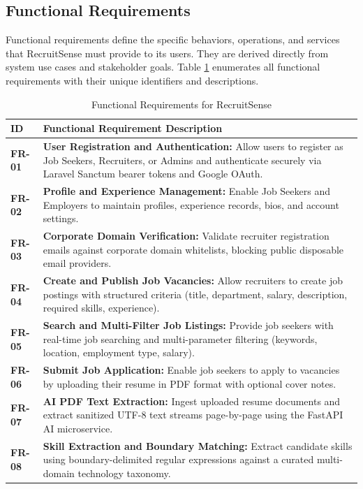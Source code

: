 \subsection{Functional Requirements}
Functional requirements define the specific behaviors, operations, and services that RecruitSense must provide to its users. They are derived directly from system use cases and stakeholder goals. Table \ref{tab:functional_reqs} enumerates all functional requirements with their unique identifiers and descriptions.

\begin{table}[h!]
\centering
\small
\caption{Functional Requirements for RecruitSense}
\label{tab:functional_reqs}
\begin{tabular}{|l|p{12cm}|}
\hline
\textbf{ID} & \textbf{Functional Requirement Description} \\ \hline
\textbf{FR-01} & \textbf{User Registration and Authentication:} Allow users to register as Job Seekers, Recruiters, or Admins and authenticate securely via Laravel Sanctum bearer tokens and Google OAuth. \\ \hline
\textbf{FR-02} & \textbf{Profile and Experience Management:} Enable Job Seekers and Employers to maintain profiles, experience records, bios, and account settings. \\ \hline
\textbf{FR-03} & \textbf{Corporate Domain Verification:} Validate recruiter registration emails against corporate domain whitelists, blocking public disposable email providers. \\ \hline
\textbf{FR-04} & \textbf{Create and Publish Job Vacancies:} Allow recruiters to create job postings with structured criteria (title, department, salary, description, required skills, experience). \\ \hline
\textbf{FR-05} & \textbf{Search and Multi-Filter Job Listings:} Provide job seekers with real-time job searching and multi-parameter filtering (keywords, location, employment type, salary). \\ \hline
\textbf{FR-06} & \textbf{Submit Job Application:} Enable job seekers to apply to vacancies by uploading their resume in PDF format with optional cover notes. \\ \hline
\textbf{FR-07} & \textbf{AI PDF Text Extraction:} Ingest uploaded resume documents and extract sanitized UTF-8 text streams page-by-page using the FastAPI AI microservice. \\ \hline
\textbf{FR-08} & \textbf{Skill Extraction and Boundary Matching:} Extract candidate skills using boundary-delimited regular expressions against a curated multi-domain technology taxonomy. \\ \hline

\end{tabular}
\end{table}
